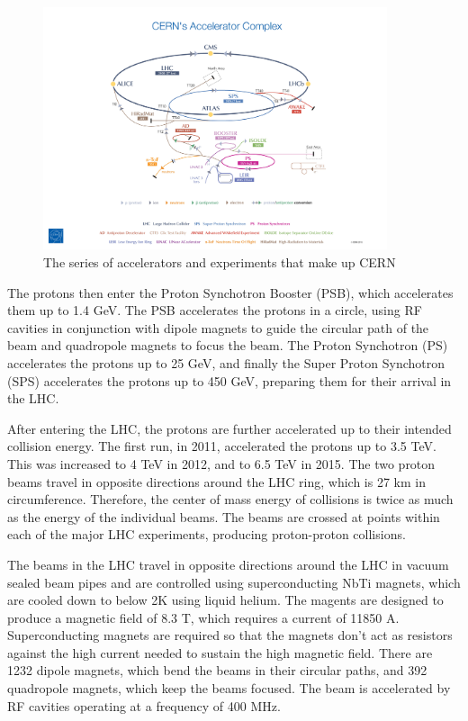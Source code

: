 \documentclass[oneside, letterpaper, oldfontcommands]{memoir}
\begin{document}
\begin{figure}[here]
\includegraphics[width=0.9\textwidth]{CERN's-accelerator-complex2013.jpg}
\caption{The series of accelerators and experiments that make up CERN \cite{Marcastel:1621583}}
\label{fig:cernacc}
\end{figure}

\qquad The protons then enter the Proton Synchotron Booster (PSB), which accelerates them up to 1.4 GeV. The PSB accelerates the protons in a circle, using RF cavities in conjunction with dipole magnets to guide the circular path of the beam and quadropole magnets to focus the beam. The Proton Synchotron (PS) accelerates the protons up to 25 GeV, and finally the Super Proton Synchotron (SPS) accelerates the protons up to 450 GeV, preparing them for their arrival in the LHC.

\qquad After entering the LHC, the protons are further accelerated up to their intended collision energy. The first run, in 2011, accelerated the protons up to 3.5 TeV. This was increased to 4 TeV in 2012, and to 6.5 TeV in 2015. The two proton beams travel in opposite directions around the LHC ring, which is 27 km in circumference. Therefore, the center of mass energy of collisions is twice as much as the energy of the individual beams. The beams are crossed at points within each of the major LHC experiments, producing proton-proton collisions.

\qquad The beams in the LHC travel in opposite directions around the LHC in vacuum sealed beam pipes and are controlled using superconducting NbTi magnets, which are cooled down to below 2K using liquid helium. The magents are designed to produce a magnetic field of 8.3 T, which requires a current of 11850 A. Superconducting magnets are required so that the magnets don't act as resistors against the high current needed to sustain the high magnetic field. There are 1232 dipole magnets, which bend the beams in their circular paths, and 392 quadropole magnets, which keep the beams focused. The beam is accelerated by RF cavities operating at a frequency of 400 MHz.
\end{document}
